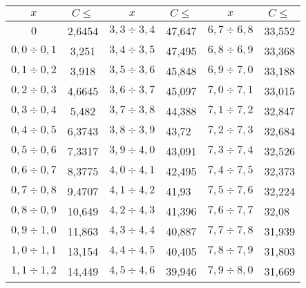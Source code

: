 \begin{table}\small %
\begin{center}
\vspace*{2ex}

\begin{tabular}{||c|c||c|l||c|l||}
\hline
$x$ & $C\leqslant$ & $x$ & \multicolumn{1}{c||}{$C\leqslant$} & $x$ & 
\multicolumn{1}{c||}{$C\leqslant$}\\
\hline
$       0   $ & \hphantom{99}2{,}6454  & $ 3{,}3 \div    3{,}4 $ & 47{,}647  & $ 6{,}7 \div    6{,}8 $ & 33{,}552  \\
$   0{,}0 \div    0{,}1 $ & \hphantom{9}3{,}251   & $ 3{,}4 \div    3{,}5 $ & 47{,}495  & $ 6{,}8 \div    6{,}9 $ & 33{,}368  \\
$   0{,}1 \div    0{,}2 $ & \hphantom{9}3{,}918   & $ 3{,}5 \div    3{,}6 $ & 45{,}848  & $ 6{,}9 \div    7{,}0$ & 33{,}188  \\
$   0{,}2 \div    0{,}3 $ & \hphantom{99}4{,}6645  & $ 3{,}6 \div    3{,}7 $ & 45{,}097  & $ 7{,}0 \div    7{,}1 $ & 33{,}015  \\
$   0{,}3 \div    0{,}4 $ & \hphantom{9}5{,}482   & $ 3{,}7 \div    3{,}8 $ & 44{,}388  & $ 7{,}1 \div    7{,}2 $ & 32{,}847  \\
$   0{,}4 \div    0{,}5 $ & \hphantom{99}6{,}3743  & $ 3{,}8 \div    3{,}9 $ & 43{,}72   & $ 7{,}2 \div    7{,}3 $ & 32{,}684  \\
$   0{,}5 \div    0{,}6 $ & \hphantom{99}7{,}3317  & $ 3{,}9 \div    4{,}0 $ & 43{,}091  & $ 7{,}3 \div    7{,}4 $ & 32{,}526  \\
$   0{,}6 \div    0{,}7 $ & \hphantom{99}8{,}3775  & $ 4{,}0 \div    4{,}1 $ & 42{,}495  & $ 7{,}4 \div    7{,}5 $ & 32{,}373  \\
$   0{,}7 \div    0{,}8 $ & \hphantom{99}9{,}4707  & $ 4{,}1 \div    4{,}2 $ & 41{,}93   & $ 7{,}5 \div    7{,}6 $ & 32{,}224  \\
$   0{,}8 \div    0{,}9 $ & 10{,}649  & $ 4{,}2 \div    4{,}3 $ & 41{,}396  & $ 7{,}6 \div    7{,}7 $ & 32{,}08   \\
$   0{,}9 \div    1{,}0 $ & 11{,}863  & $ 4{,}3 \div    4{,}4 $ & 40{,}887  & $ 7{,}7 \div    7{,}8 $ & 31{,}939  \\
$   1{,}0 \div    1{,}1 $ & 13{,}154  & $ 4{,}4 \div    4{,}5 $ & 40{,}405  & $ 7{,}8 \div    7{,}9 $ & 31{,}803  \\
$   1{,}1 \div    1{,}2 $ & 14{,}449  & $ 4{,}5 \div    4{,}6 $ & 39{,}946  & $ 7{,}9 \div    8{,}0$ & 31{,}669  \\

\end{tabular}
\end{center}
\end{table}
